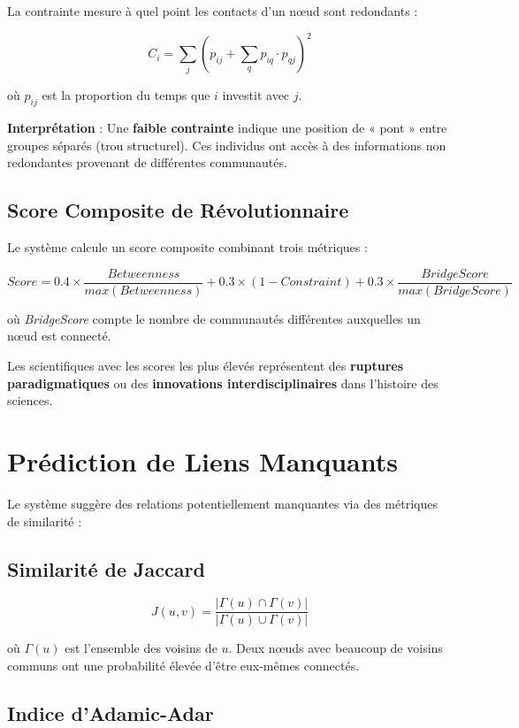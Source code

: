 \documentclass[12pt,a4paper]{report}
\begin{document}
La contrainte mesure à quel point les contacts d'un nœud sont redondants :

$$C_i = \sum_{j} \left( p_{ij} + \sum_{q} p_{iq} \cdot p_{qj} \right)^2$$

où $p_{ij}$ est la proportion du temps que $i$ investit avec $j$.

\textbf{Interprétation} : Une \textbf{faible contrainte} indique une position de « pont » entre groupes séparés (trou structurel). Ces individus ont accès à des informations non redondantes provenant de différentes communautés.

\subsection{Score Composite de Révolutionnaire}

Le système calcule un score composite combinant trois métriques :

$$Score = 0.4 \times \frac{Betweenness}{max(Betweenness)} + 0.3 \times (1 - Constraint) + 0.3 \times \frac{BridgeScore}{max(BridgeScore)}$$

où \textit{BridgeScore} compte le nombre de communautés différentes auxquelles un nœud est connecté.

Les scientifiques avec les scores les plus élevés représentent des \textbf{ruptures paradigmatiques} ou des \textbf{innovations interdisciplinaires} dans l'histoire des sciences.

\section{Prédiction de Liens Manquants}

Le système suggère des relations potentiellement manquantes via des métriques de similarité :

\subsection{Similarité de Jaccard}

$$J(u, v) = \frac{|\Gamma(u) \cap \Gamma(v)|}{|\Gamma(u) \cup \Gamma(v)|}$$

où $\Gamma(u)$ est l'ensemble des voisins de $u$. Deux nœuds avec beaucoup de voisins communs ont une probabilité élevée d'être eux-mêmes connectés.

\subsection{Indice d'Adamic-Adar}
\end{document}
